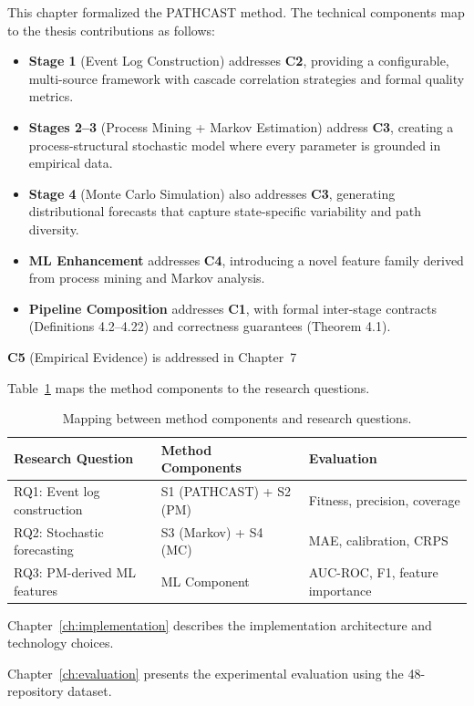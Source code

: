 This chapter formalized the PATHCAST method. The technical components
map to the thesis contributions as follows:

\begin{itemize}
  \item \textbf{Stage 1} (Event Log Construction) addresses \textbf{C2},
    providing a configurable, multi-source framework with cascade
    correlation strategies and formal quality metrics.
  \item \textbf{Stages 2--3} (Process Mining + Markov Estimation) address
    \textbf{C3}, creating a process-structural stochastic model where every
    parameter is grounded in empirical data.
  \item \textbf{Stage 4} (Monte Carlo Simulation) also addresses
    \textbf{C3}, generating distributional forecasts that capture
    state-specific variability and path diversity.
  \item \textbf{ML Enhancement} addresses \textbf{C4}, introducing a novel
    feature family derived from process mining and Markov analysis.
  \item \textbf{Pipeline Composition} addresses \textbf{C1}, with formal
    inter-stage contracts (Definitions 4.2--4.22) and correctness
    guarantees (Theorem 4.1).
\end{itemize}

\textbf{C5} (Empirical Evidence) is addressed in Chapter~7

Table~\ref{tab:method-rq-mapping} maps the method components to the 
research questions.

\begin{table}[htbp]
\centering
\caption{Mapping between method components and research questions.}
\label{tab:method-rq-mapping}
\begin{tabular}{lll}
\toprule
\textbf{Research Question} & \textbf{Method Components} & \textbf{Evaluation} \\
\midrule
RQ1: Event log construction & S1 (PATHCAST) + S2 (PM) & Fitness, precision, coverage \\
RQ2: Stochastic forecasting & S3 (Markov) + S4 (MC) & MAE, calibration, CRPS \\
RQ3: PM-derived ML features & ML Component & AUC-ROC, F1, feature importance \\
\bottomrule
\end{tabular}
\end{table}

Chapter~\ref{ch:implementation} describes the implementation architecture 
and technology choices. 

Chapter~\ref{ch:evaluation} presents the 
experimental evaluation using the 48-repository dataset.
